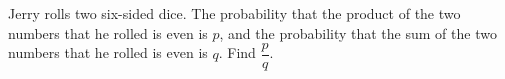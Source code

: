 Jerry rolls two six-sided dice. The probability that the product of the two numbers that he rolled is even is $p
$, and the probability that the sum of the two numbers that he rolled is even is $q$. Find $\dfrac{p}{q}$.
